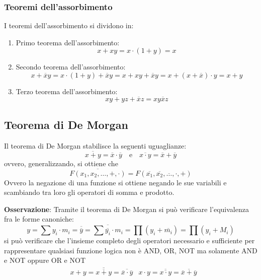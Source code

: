 \documentclass[a4paper]{extarticle}
\begin{document}
\subsubsection{Teoremi dell'assorbimento}
I teoremi dell'assorbimento si dividono in:
\begin{enumerate}
    \item Primo teorema dell'assorbimento:
    \[x+xy=x \cdot (1+y)=x\]
    \item Secondo teorema dell'assorbimento:
    \[x+\overline{x} y = x \cdot (1+y)+\overline{x}y = x + xy + \overline{x}y = x + (x + \overline{x}) \cdot y = x+y\]
    \item Terzo teorema dell'assorbimento:
    \[xy+yz+\overline{x}z=xy\overline{x}z\]
\end{enumerate}

\vspace{1em}
\noindent
\subsection{Teorema di De Morgan}
Il teorema di De Morgan stabilisce la seguenti uguaglianze:
\[\overline{x+y}=\overline{x} \cdot \overline{y} \hspace{1em} \text{e} \hspace{1em} \overline{x \cdot y} = \overline{x} + \overline{y}\]
ovvero, generalizzando, si ottiene che
\[\overline{F(x_1,x_2,\dots,+,\cdot)} = F(\overline{x_1},\overline{x_2},\overline{\dots},\cdot,+)\]
Ovvero la negazione di una funzione si ottiene negando le sue variabili e scambiando tra loro gli operatori di somma e prodotto.

\vspace{1em}
\noindent
\textbf{Osservazione}: Tramite il teorema di De Morgan si può verificare l'equivalenza fra le forme canoniche:
\[y=\sum y_i \cdot m_i = \overline{\overline{y}} = \overline{\sum \overline{y_i} \cdot m_i} = \prod (y_i + \overline{m_i}) = \prod (y_i + M_i)\]
si può verificare che l'insieme completo degli operatori necessario e sufficiente per rappresentare qualsiasi funzione logica non è AND, OR, NOT ma solamente AND e NOT oppure OR e NOT
\begin{align*}
    &x+y=\overline{\overline{x+y}}=\overline{\overline{x} \cdot \overline{y}}
    &x \cdot y=\overline{\overline{x \cdot y}}=\overline{\overline{x} + \overline{y}}
\end{align*}

\vspace{1em}
\noindent
\end{document}
